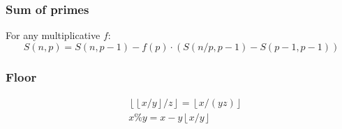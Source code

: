     \subsubsection{Sum of primes} For any multiplicative $f$:
      \[
          S(n,p) = S(n, p-1) - f(p) \cdot (S(n/p,p-1) - S(p-1,p-1))
      \]

    \subsubsection{Floor}
      \begin{align*}
          &\left\lfloor \left\lfloor x/y \right\rfloor / z \right\rfloor = \left\lfloor x / (yz) \right\rfloor \\
          &x \% y = x - y \left\lfloor x / y \right\rfloor
      \end{align*}


\iffalse
  \clearpage
  \section*{Practice Contest Checklist}
    \begin{itemize}
      \item How many operations per second? Compare to local machine.
      \item What is the stack size?
      \item How to use printf/scanf with long long/long double?
      \item Are \texttt{\_{}\_{}int128} and \texttt{\_{}\_{}float128} available?
      \item Does MLE give RTE or MLE as a verdict? What about stack overflow?
      \item What is \texttt{RAND\_{}MAX}?
      \item How does the judge handle extra spaces (or missing newlines) in the output?
      \item Look at documentation for programming languages.
      \item Try different programming languages: C++, Java and Python.
      \item Try the submit script.
      \item Try local programs: i?python[23], factor.
      \item Try submitting with \texttt{assert(false)} and \texttt{assert(true)}.
      \item Return-value from \texttt{main}.
      \item Look for directory with sample test cases.
      \item Make sure printing works.

      \item Remove this page from the notebook.
    \end{itemize}
\fi
